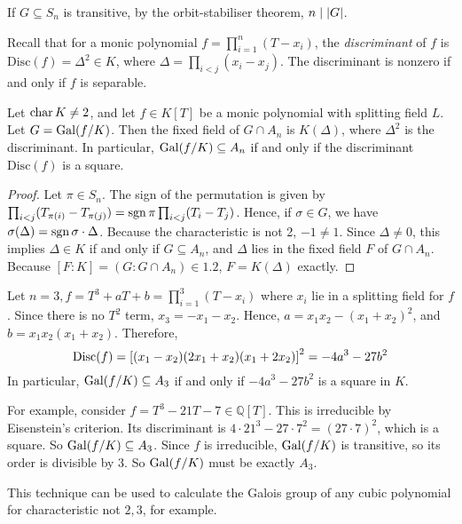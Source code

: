 \begin{remark}
	If \( G \subseteq S_n \) is transitive, by the orbit-stabiliser theorem, \( n \mid \abs{G} \).
\end{remark}
Recall that for a monic polynomial \( f = \prod_{i=1}^n (T - x_i) \), the \emph{discriminant} of \( f \) is \( \mathrm{Disc}(f) = \Delta^2 \in K \), where \( \Delta = \prod_{i < j} (x_i - x_j) \).
The discriminant is nonzero if and only if \( f \) is separable.
\begin{proposition}
	Let \( \operatorname{char} K \neq 2 \), and let \( f \in K[T] \) be a monic polynomial with splitting field \( L \).
	Let \( G = \operatorname{Gal}(f/K) \).
	Then the fixed field of \( G \cap A_n \) is \( K(\Delta) \), where \( \Delta^2 \) is the discriminant.
	In particular, \( \operatorname{Gal}(f/K) \subseteq A_n \) if and only if the discriminant \( \mathrm{Disc}(f) \) is a square.
\end{proposition}
\begin{proof}
	Let \( \pi \in S_n \).
	The sign of the permutation is given by \( \prod_{i < j} (T_{\pi(i)} - T_{\pi(j)}) = \operatorname{sgn} \pi \prod_{i < j} (T_i - T_j) \).
	Hence, if \( \sigma \in G \), we have \( \sigma(\Delta) = \operatorname{sgn} \sigma \cdot \Delta \).
	Because the characteristic is not 2, \( -1 \neq 1 \).
	Since \( \Delta \neq 0 \), this implies \( \Delta \in K \) if and only if \( G \subseteq A_n \), and \( \Delta \) lies in the fixed field \( F \) of \( G \cap A_n \).
	Because \( [F : K] = (G : G \cap A_n) \in \qty{1, 2} \), \( F = K(\Delta) \) exactly.
\end{proof}
\begin{example}
	Let \( n = 3, f = T^3 + aT + b = \prod_{i=1}^3 (T - x_i) \) where \( x_i \) lie in a splitting field for \( f \).
	Since there is no \( T^2 \) term, \( x_3 = -x_1 - x_2 \).
	Hence, \( a = x_1 x_2 - (x_1 + x_2)^2 \), and \( b = x_1x_2(x_1 + x_2) \).
	Therefore,
	\[ \mathrm{Disc}(f) = \qty[(x_1-x_2)(2x_1+x_2)(x_1+2x_2)]^2 = -4a^3 - 27b^2 \]
	In particular, \( \operatorname{Gal}(f/K) \subseteq A_3 \) if and only if \( -4a^3 - 27b^2 \) is a square in \( K \).

	For example, consider \( f = T^3 - 21T - 7 \in \mathbb Q[T] \).
	This is irreducible by Eisenstein's criterion.
	Its discriminant is \( 4 \cdot 21^3 - 27 \cdot 7^2 = (27 \cdot 7)^2 \), which is a square.
	So \( \operatorname{Gal}(f/K) \subseteq A_3 \).
	Since \( f \) is irreducible, \( \operatorname{Gal}(f/K) \) is transitive, so its order is divisible by 3.
	So \( \operatorname{Gal}(f/K) \) must be exactly \( A_3 \).
\end{example}
\begin{remark}
	This technique can be used to calculate the Galois group of any cubic polynomial for characteristic not \( 2, 3 \), for example.
\end{remark}
